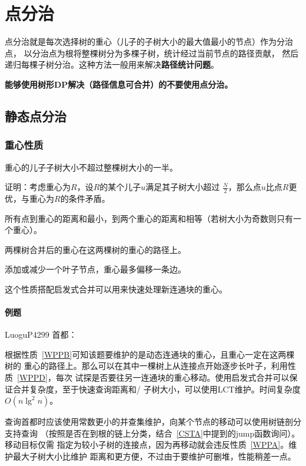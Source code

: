 \section{点分治}
点分治就是每次选择树的重心（儿子的子树大小的最大值最小的节点）作为分治点，
以分治点为根将整棵树分为多棵子树，统计经过当前节点的路径贡献，
然后递归每棵子树分治。这种方法一般用来解决{\bfseries 路径统计问题}。

{\bfseries 能够使用树形DP解决（路径信息可合并）的不要使用点分治。}
\subsection{静态点分治}
\subsubsection{重心性质}
\begin{property}\label{WPPA}
    重心的儿子子树大小不超过整棵树大小的一半。
\end{property}
证明：考虑重心为$R$，设$R$的某个儿子$u$满足其子树大小超过
$\frac{N}{2}$，那么点$u$比点$R$更优，与重心为$R$的条件矛盾。
\begin{property}\label{WPPB}
    所有点到重心的距离和最小，到两个重心的距离和相等（若树大小为奇数则只有一个重心）。
\end{property}
\begin{property}\label{WPPC}
    两棵树合并后的重心在这两棵树的重心的路径上。
\end{property}
\begin{property}\label{WPPD}
    添加或减少一个叶子节点，重心最多偏移一条边。
\end{property}

这个性质搭配启发式合并可以用来快速处理新连通块的重心。

\paragraph{例题} LuoguP4299 首都：

根据性质~\ref{WPPB}可知该题要维护的是动态连通块的重心，且重心一定在这两棵树的
重心的路径上。那么可以在其中一棵树上从连接点开始逐步长叶子，利用性质~\ref{WPPD}，每次
试探是否要往另一连通块的重心移动。使用启发式合并可以保证合并复杂度，至于快速查询距离和/
子树大小，可以使用LCT维护。时间复杂度$O(n\lg^2n)$。

查询首都时应该使用常数更小的并查集维护，向某个节点的移动可以使用树链剖分支持查询
（按照是否在到根的链上分类，结合~\ref{CSTA}中提到的jump函数询问）。移动目标仅需
指定为较小子树的连接点，因为再移动就会违反性质~\ref{WPPA}。维护最大子树大小比维护
距离和更方便，不过由于要维护可删堆，性能稍差一点。

